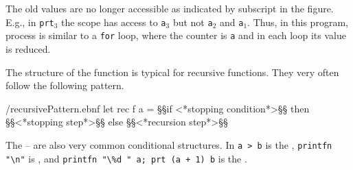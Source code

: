 The old values are no longer accessible as indicated by subscript in the figure. E.g., in \lstinline{prt}$_3$ the scope has access to \lstinline{a}$_3$ but not \lstinline{a}$_2$ and \lstinline{a}$_1$. Thus, in this program, process is similar to a \lstinline{for} loop, where the counter is \lstinline{a} and in each loop its value is reduced.

The structure of the function is typical for recursive functions. They very often follow the following pattern.
\begin{verbatimwrite}{\ebnf/recursivePattern.ebnf}
let rec f a =
  §§if <*stopping condition*>§§
  then §§<*stopping step*>§§
  else §§<*recursion step*>§§
\end{verbatimwrite}
%
The  --  are also very common conditional structures. In  \lstinline{a > b} is the , \lstinline{printfn "\n"} is , and \lstinline{printfn "\%d " a; prt (a + 1) b} is the .

